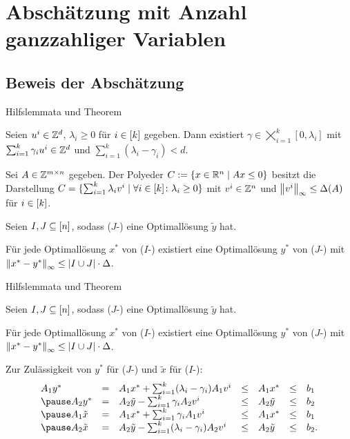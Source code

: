 \section{Abschätzung mit Anzahl ganzzahliger Variablen}

\subsection{Beweis der Abschätzung}

\begin{frame}{Hilfslemmata und Theorem}
	\renewcommand{\thisthmnumber}{2.9}
	\begin{lem}\label{lem:maxgamma}
		Seien $u^i\in\mathbb{Z}^d$, $\lambda_i\geq0$ für $i\in[k]$ gegeben.
		Dann existiert $\gamma\in\bigtimes_{i=1}^k [0,\lambda_i]$ mit $\sum_{i=1}^k \gamma_i u^i\in\mathbb{Z}^d$ und  $\sum_{i=1}^k(\lambda_i-\gamma_i)<d$.
	\end{lem}
	\pause
	\renewcommand{\thisthmnumber}{2.10}
	\begin{lem}
	Sei $A\in\mathbb{Z}^{m\times n}$ gegeben.
	Der Polyeder $C:=\{ x\in\mathbb{R}^n \mid A x\leq 0 \}$ besitzt die Darstellung $C=\{\sum_{i=1}^k\lambda_i v^i \mid \forall i\in[k] \colon\lambda_i\geq0 \}$ mit $v^i\in\mathbb{Z}^n$ und $\left\lVert v^i\right\rVert_\infty\leq\Delta(A)$ für $i\in[k]$.
	\end{lem}
	\pause
	\renewcommand{\thisthmnumber}{2.11}
	\begin{thm}\label{thm:theo2}
		Seien $I,J\subseteq[n]$, sodass ($J$-\MIPI) eine Optimallösung $\tilde{y}$ hat.
		
		Für jede Optimallösung $x^*$ von ($I$-\MIPI) existiert eine Optimallösung $y^*$ von ($J$-\MIPI) mit $\left\lVert x^*-y^*\right\rVert_\infty\leq\lvert I\cup J \rvert\cdot\Delta$.
	\end{thm}
\end{frame}

\begin{frame}{Hilfslemmata und Theorem}
\renewcommand{\thisthmnumber}{2.11}
\begin{thm}\label{thm:theo2}
Seien $I,J\subseteq[n]$, sodass ($J$-\MIPI) eine Optimallösung $\tilde{y}$ hat.

Für jede Optimallösung $x^*$ von ($I$-\MIPI) existiert eine Optimallösung $y^*$ von ($J$-\MIPI) mit $\left\lVert x^*-y^*\right\rVert_\infty\leq\lvert I\cup J \rvert\cdot\Delta$.
\end{thm}
Zur Zulässigkeit von $y^*$ für ($J$-\MIPI) und $\tilde{x}$ für ($I$-\MIPI):
\pause
$$
\begin{array}{lllllll}
A_1 y^*&=&A_1x^*+\sum_{i=1}^k(\lambda_i-\gamma_i)A_1v^i &\leq& A_1 x^* &\leq&b_1\\ \pause
A_2 y^*&=&A_2\tilde{y}-\sum_{i=1}^k\gamma_iA_2v^i &\leq& A_2\tilde{y} &\leq& b_2\\ \pause
A_1\tilde{x} &=&A_1x^*+\sum_{i=1}^k \gamma_iA_1v^i &\leq& A_1x^* &\leq&b_1\\ \pause
A_2\tilde{x} &=&A_2\tilde{y}-\sum_{i=1}^k(\lambda_i-\gamma_i)A_2v^i&\leq& A_2\tilde{y}&\leq& b_2.
\end{array}
$$
\end{frame}

